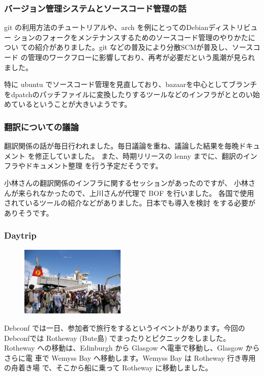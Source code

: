 \documentclass[mingoth,a4paper]{jsarticle}
\begin{document}
\subsubsection{バージョン管理システムとソースコード管理の話}

git の利用方法のチュートリアルや、arch を例にとってのDebianディストリビュー
ションのフォークをメンテナンスするためのソースコード管理のやりかたについ
ての紹介がありました。git などの普及により分散SCMが普及し、ソースコード
の管理のワークフローに影響しており、再考が必要だという風潮が見られました。

特に ubuntu でソースコード管理を見直しており、bazaarを中心としてブランチ
をdpatchのパッチファイルに変換したりするツールなどのインフラがととのい始
めているということが大きいようです。

\subsubsection{翻訳についての議論}

翻訳関係の話が毎日行われました。毎日議論を重ね、議論した結果を毎晩ドキュメント
を修正していました。
また、時期リリースの lenny までに、翻訳のインフラやドキュメント整理
を行う予定だそうです。

小林さんの翻訳関係のインフラに関するセッションがあったのですが、
小林さんが来られなかったので、上川さんが代理で BOF を行いました。
各国で使用されているツールの紹介などがありました。日本でも導入を検討
をする必要がありそうです。

\subsubsection{Daytrip}


\begin{figure}
\includegraphics[width=5cm]{image200706/debconf7-daytrip.jpg}
\end{figure}

Debconf では一日、参加者で旅行をするというイベントがあります。今回の
Debconfでは Rotheway (Bute島) でまったりとピクニックをしました。Rotheway 
への移動は、Edinburgh から Glasgow へ電車で移動し、Glasgow からさらに電
車で Wemyss Bay へ移動します。Wemyss Bay は Rotheway 行き専用の舟着き場
で、そこから船に乗って Rotheway に移動しました。
\end{document}
